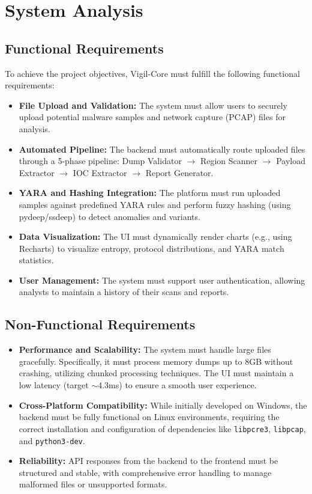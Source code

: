 \chapter{System Analysis}

\section{Functional Requirements}
To achieve the project objectives, Vigil-Core must fulfill the following functional requirements:
\begin{itemize}
    \item \textbf{File Upload and Validation:} The system must allow users to securely upload potential malware samples and network capture (PCAP) files for analysis.
    \item \textbf{Automated Pipeline:} The backend must automatically route uploaded files through a 5-phase pipeline: Dump Validator $\rightarrow$ Region Scanner $\rightarrow$ Payload Extractor $\rightarrow$ IOC Extractor $\rightarrow$ Report Generator.
    \item \textbf{YARA and Hashing Integration:} The platform must run uploaded samples against predefined YARA rules and perform fuzzy hashing (using pydeep/ssdeep) to detect anomalies and variants.
    \item \textbf{Data Visualization:} The UI must dynamically render charts (e.g., using Recharts) to visualize entropy, protocol distributions, and YARA match statistics.
    \item \textbf{User Management:} The system must support user authentication, allowing analysts to maintain a history of their scans and reports.
\end{itemize}

\section{Non-Functional Requirements}
\begin{itemize}
    \item \textbf{Performance and Scalability:} The system must handle large files gracefully. Specifically, it must process memory dumps up to 8GB without crashing, utilizing chunked processing techniques. The UI must maintain a low latency (target $\sim$4.3ms) to ensure a smooth user experience.
    \item \textbf{Cross-Platform Compatibility:} While initially developed on Windows, the backend must be fully functional on Linux environments, requiring the correct installation and configuration of dependencies like \texttt{libpcre3}, \texttt{libpcap}, and \texttt{python3-dev}.
    \item \textbf{Reliability:} API responses from the backend to the frontend must be structured and stable, with comprehensive error handling to manage malformed files or unsupported formats.
\end{itemize}

